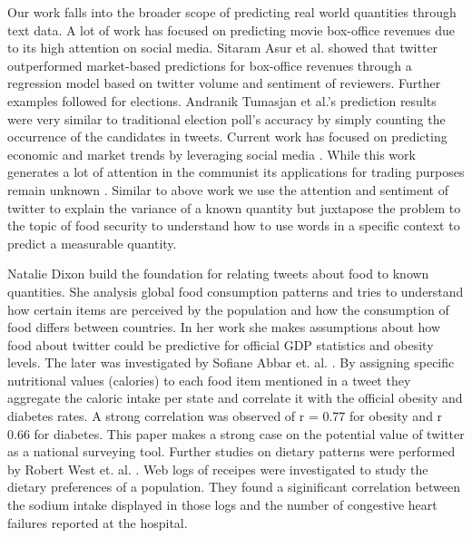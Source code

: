 Our work falls into the broader scope of predicting real world quantities through text data. A lot of work has focused on predicting movie box-office revenues due to its high attention on social media. Sitaram Asur et al. \cite{Asur10} showed that twitter outperformed market-based predictions for box-office revenues through a regression model based on twitter volume and sentiment of reviewers. Further examples followed for elections. Andranik Tumasjan et al.'s  \cite{tumasjan2010} prediction results were very similar to  traditional election poll's accuracy by simply counting the occurrence of the candidates in tweets. Current work has focused on predicting economic and market trends by leveraging social media \cite{xue12} \cite{de08} \cite{Si_exploitingtopic}. While this work generates a lot of attention in the communist its applications for trading purposes remain unknown \cite{sentiment2014}. Similar to above work we use the attention and sentiment of twitter to explain the variance of a known quantity but juxtapose the problem to the topic of food security to understand how to use words in a specific context to predict a measurable quantity. 

Natalie Dixon \cite{dixon} build the foundation for relating tweets about food to known quantities. She analysis global food consumption patterns and  tries to understand how certain items are perceived by the population and how the consumption of food differs between countries. In her work she makes assumptions about how food about twitter could be predictive for official GDP statistics and obesity levels. The later was investigated by Sofiane Abbar et. al. \cite{AbbarMW14}. By assigning specific nutritional values (calories) to each food item mentioned in a tweet they aggregate the caloric intake per state and correlate it with the official obesity and diabetes rates. A strong correlation was observed of r = 0.77 for obesity and r 0.66 for diabetes. This paper makes a strong case on the potential value of twitter as a national surveying tool. Further studies on dietary patterns were performed by Robert West et. al. \cite{west2013}. Web logs of receipes were investigated to study the dietary preferences of a population. They found a siginificant correlation between the sodium intake displayed in those logs and the number of congestive heart failures reported at the hospital. 

